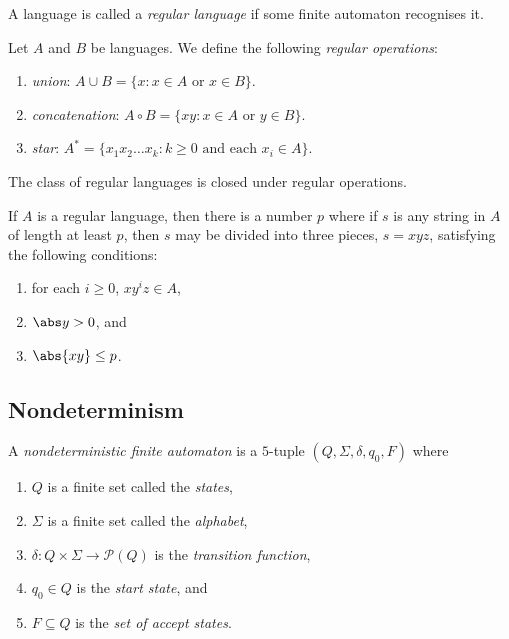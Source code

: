 \documentclass{article}
\begin{document}
\begin{definition}[Sipser p. 40]
    A language is called a \emph{regular language} if some finite automaton recognises it.
\end{definition}

\begin{definition}[Sipser p. 44]
    Let $A$ and $B$ be languages. We define the following \emph{regular operations}:
    \begin{enumerate}
        \item \emph{union}: $A\cup B=\{x : x \in A \text{ or } x \in B\}$.
        \item \emph{concatenation}: $A\circ B=\{xy : x \in A \text{ or } y \in B\}$.
        \item \emph{star}: $A^* = \{x_1x_2\dots x_k:k\geq 0 \text{ and each }x_i\in A\}$.
    \end{enumerate}
\end{definition}

\begin{theorem}[Sipser p. 45, 60, 62]
    The class of regular languages is closed under regular operations.
\end{theorem}

\begin{theorem}
    If $A$ is a regular language, then there is a number $p$ where if $s$
    is any string in $A$ of length at least $p$, then $s$ may be divided
    into three pieces, $s=xyz$, satisfying the following conditions:
    \begin{enumerate}
        \item for each $i\geq 0$, $xy^iz\in A$,
        \item $\abs y > 0$, and
        \item $\abs{xy} \leq p$.
    \end{enumerate}
\end{theorem}

\subsection{Nondeterminism}

\begin{definition}
    A \emph{nondeterministic finite automaton} is a $5$-tuple $(Q,\Sigma,\delta,q_0,F)$ where
    \begin{enumerate}
        \item $Q$ is a finite set called the \emph{states},
        \item $\Sigma$ is a finite set called the \emph{alphabet},
        \item $\delta:Q\times\Sigma\to\mathcal{P}(Q)$ is the \emph{transition function},
        \item $q_0\in Q$ is the \emph{start state}, and
        \item $F\subseteq Q$ is the \emph{set of accept states}.
    \end{enumerate}
\end{definition}
\end{document}
